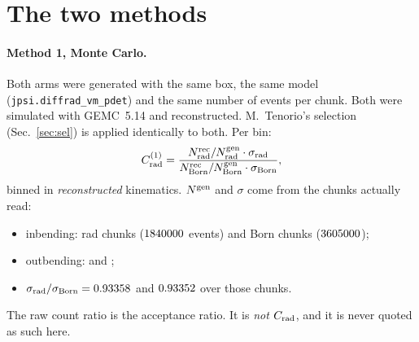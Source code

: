 \documentclass[11pt]{article}
\newcommand{\crad}{C_{\rm rad}}
\begin{document}
\tableofcontents
\newpage

\section{The two methods}

\paragraph{Method 1, Monte Carlo.} Both arms were generated with the same box, the same model
(\texttt{jpsi.diffrad\_vm\_pdet}) and the same number of events per chunk. Both were simulated with GEMC~5.14
and reconstructed. M.~Tenorio's selection (Sec.~\ref{sec:sel}) is applied identically to both. Per bin:
\begin{equation}
\crad^{(1)} = \frac{N^{\rm rec}_{\rm rad}/N^{\rm gen}_{\rm rad}\cdot\sigma_{\rm rad}}
                   {N^{\rm rec}_{\rm Born}/N^{\rm gen}_{\rm Born}\cdot\sigma_{\rm Born}} ,
\end{equation}
binned in \emph{reconstructed} kinematics. $N^{\rm gen}$ and $\sigma$ come from the chunks actually read:
\begin{itemize}
\item inbending: \nchRadIn{} rad chunks ($1840000$ events) and \nchBornIn{} Born chunks ($3605000$);
\item outbending: \nchRadOut{} and \nchBornOut{};
\item $\sigma_{\rm rad}/\sigma_{\rm Born}=0.93358$ and $0.93352$ over those chunks.
\end{itemize}
The raw count ratio is the acceptance ratio. It is \emph{not} $\crad$, and it is never quoted as such here.
\end{document}
